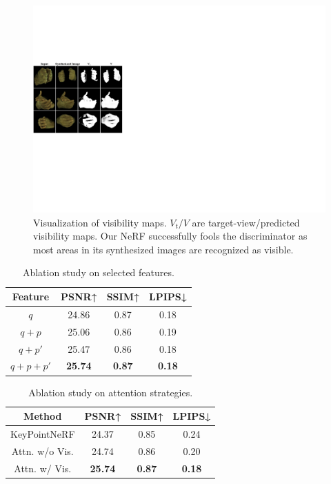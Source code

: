 \documentclass[letterpaper]{article} %
\begin{document}
\begin{figure}[t]
  \centering
  \includegraphics[width=1.0\hsize]{figures/vis_dis.pdf}
  \caption{Visualization of visibility maps. $V_t /V$ are target-view/predicted visibility maps. Our NeRF successfully fools the discriminator as most areas in its synthesized images are recognized as visible.}
  \label{fig:vis_dis}
\end{figure}


\begin{table}[t]
    \caption{Ablation study on selected features.}
    \label{tab:feats}
    \centering
    \begin{tabular}{cccc}
        \toprule
        Feature     & PSNR↑    & SSIM↑    & LPIPS↓     \\
        \midrule
        $q$ & 24.86 & 0.87 & 0.18 \\
        $q + p$ & 25.06 & 0.86 & 0.19 \\
        $q + p'$ & 25.47 & 0.86  & 0.18   \\
        $q + p + p'$ & \textbf{25.74} & \textbf{0.87}  & \textbf{0.18}     \\
        \bottomrule
    \end{tabular}
\end{table}

\begin{table}[t]
    \caption{Ablation study on attention strategies.}
    \label{tab:attn}
    \centering
    \begin{tabular}{cccc}
    \toprule
        Method     & PSNR↑    & SSIM↑    & LPIPS↓     \\
        \midrule
        KeyPointNeRF & 24.37 & 0.85 & 0.24 \\ \hline
        Attn. w/o Vis. & 24.74 & 0.86 & 0.20 \\
        Attn. w/ Vis. & \textbf{25.74} & \textbf{0.87} & \textbf{0.18} \\ 
        \bottomrule
    \end{tabular}
\end{table}
\end{document}
